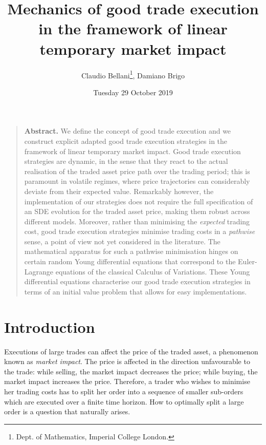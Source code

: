 \documentclass[10pt,a4paper]{article}
\author{Claudio Bellani\footnote{Dept. of Mathematics, Imperial College London.}, Damiano Brigo\footnotemark[\value{footnote}]}
\title{Mechanics of good trade execution in the framework of linear temporary market impact}
\date{Tuesday 29 October 2019}
\begin{document}
	
	\maketitle
	
	\vspace{0.5cm}
	
	\begin{quotation}\begin{small}
			\noindent	\textbf{Abstract.} We define the concept of good trade execution and we construct explicit adapted good trade execution strategies in the framework of linear  temporary market impact. Good trade execution  strategies   are dynamic, in the sense that they react to the actual realisation of the traded asset price path over the trading period; this is paramount in volatile regimes, where price trajectories can considerably deviate from their expected value. Remarkably however, the implementation of our strategies does not require the full specification of an SDE evolution for the traded asset price, making them robust across different models. Moreover,  rather than minimising the \emph{expected} trading cost, good trade execution strategies minimise  trading costs in a \emph{pathwise} sense, a point of view not yet considered in the literature. The mathematical apparatus for such a pathwise minimisation hinges on 
			certain random Young differential equations that correspond to the Euler-Lagrange equations of the classical Calculus of Variations. These Young differential equations characterise our good trade execution strategies in terms of an initial value problem that allows for easy implementations. 
	 \end{small}
	\end{quotation}

	\vspace{0.5cm}
	
%	
%	
%	
	
	
	
	\section{Introduction}
	
	Executions of large trades can affect the price of the traded asset, a phenomenon known as \emph{market impact}. The price is affected in the direction unfavourable to the trade: while selling, the market impact decreases the price; while buying, the market impact increases the price.    Therefore, a trader who wishes to minimise her trading costs has to split her order into a sequence of smaller sub-orders which are executed over a finite time horizon. How to optimally split a large order is a question that naturally arises.
	
\end{document}
